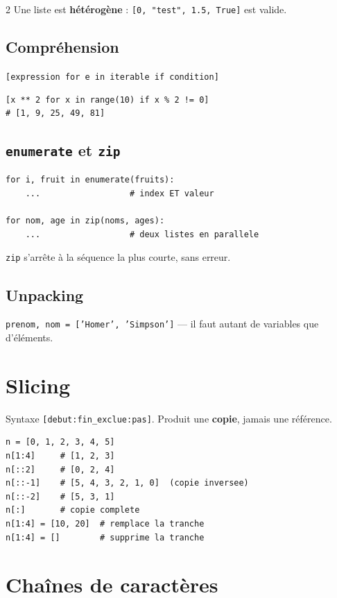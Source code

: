 \documentclass[a4paper,10pt]{article}
\newcommand{\co}[1]{\texttt{\textcolor{codefg}{#1}}}
\begin{document}
\begin{multicols}{2}
\vspace{0.4em}
Une liste est \textbf{hétérogène} : \co{[0, "test", 1.5, True]} est valide.

\subsection{Compréhension}
\co{[expression for e in iterable if condition]}

\begin{lstlisting}
[x ** 2 for x in range(10) if x % 2 != 0]
# [1, 9, 25, 49, 81]
\end{lstlisting}

\subsection{\co{enumerate} et \co{zip}}
\begin{lstlisting}
for i, fruit in enumerate(fruits):
    ...                  # index ET valeur

for nom, age in zip(noms, ages):
    ...                  # deux listes en parallele
\end{lstlisting}
\co{zip} s'arrête à la séquence la plus courte, sans erreur.

\subsection{Unpacking}
\co{prenom, nom = ['Homer', 'Simpson']} --- il faut autant de variables que
d'éléments.

\section{Slicing}

Syntaxe \co{[debut:fin\_exclue:pas]}. Produit une \textbf{copie}, jamais une
référence.

\begin{lstlisting}
n = [0, 1, 2, 3, 4, 5]
n[1:4]     # [1, 2, 3]
n[::2]     # [0, 2, 4]
n[::-1]    # [5, 4, 3, 2, 1, 0]  (copie inversee)
n[::-2]    # [5, 3, 1]
n[:]       # copie complete
n[1:4] = [10, 20]  # remplace la tranche
n[1:4] = []        # supprime la tranche
\end{lstlisting}

\section{Chaînes de caractères}


\end{multicols}
\end{document}
